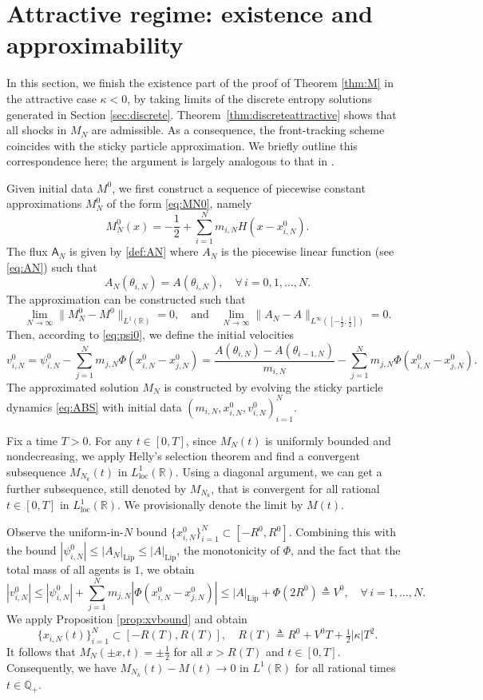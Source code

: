 \documentclass[11pt,reqno]{amsart}
\theoremstyle{definition}
\theoremstyle{remark}
\def\R{\mathbb{R}}
\def\loc{\mathrm{loc}}
\def\A{\mathsf{A}}
\DeclareMathOperator{\Lip}{Lip}
\begin{document}
	
	
	
	\section{Attractive regime: existence and approximability}
	\label{sec:gendata}
	
	In this section, we finish the existence part of the proof of Theorem \ref{thm:M} in the attractive case $\kappa<0$, by taking limits of the discrete entropy solutions generated in Section \ref{sec:discrete}.  Theorem~\ref{thm:discreteattractive} shows that all shocks in $M_N$ are admissible. As a consequence, the front-tracking scheme coincides with the sticky particle approximation. We briefly outline this correspondence here; the argument is largely analogous to that in \cite{leslie2023sticky}.
	
	Given initial data $M^0$, we first construct a sequence of piecewise constant approximations $M_N^0$ of the form \eqref{eq:MN0}, namely
	\[
	M_N^0(x) = -\frac12 + \sum_{i=1}^{N} m_{i,N} H(x - x_{i,N}^0).
	\]
	The flux $\A_N$ is given by \eqref{def:AN} where $A_N$ is the piecewise linear function (see \eqref{eq:AN}) such that
	\[
	A_N(\theta_{i,N}) = A(\theta_{i,N}),\quad \forall\,i=0,1,\ldots,N.
	\]
	The approximation can be constructed such that
	\[
	\lim_{N\to\infty}\|M_N^0-M^0\|_{L^1(\R)}=0,\quad\text{and}\quad
	\lim_{N\to\infty}\|A_N-A\|_{L^\infty([-\frac12,\frac12])}=0.
	\]
	Then, according to \eqref{eq:psi0}, we define the initial velocities 
	\[
	v_{i,N}^0 = \psi_{i,N}^0 - \sum_{j=1}^{N} m_{j,N} \Phi(x_{i,N}^0 - x_{j,N}^0)
	= \frac{A(\theta_{i,N})-A(\theta_{i-1,N})}{m_{i,N}} - \sum_{j=1}^{N} m_{j,N} \Phi(x_{i,N}^0 - x_{j,N}^0).
	\]
	The approximated solution $M_N$ is constructed by evolving the sticky particle dynamics \eqref{eq:ABS} with initial data $(m_{i,N},x_{i,N}^0,v_{i,N}^0)_{i=1}^N$.
	
	Fix a time $T>0$. For any $t\in[0,T]$, since $M_N(t)$ is uniformly bounded and nondecreasing, we apply Helly's selection theorem and find a convergent subsequence $M_{N_k}(t)$ in $L^1_{\loc}(\R)$. Using a diagonal argument, we can get a further subsequence, still denoted by $M_{N_k}$, that is convergent for all rational $t\in[0,T]$ in $L^1_{\loc}(\R)$.  We provisionally denote the limit by $M(t)$.
	
	Observe the uniform-in-$N$ bound $\{x_{i,N}^0\}_{i=1}^N\subset [-R^0, R^0]$.  Combining this with the bound $|\psi_{i,N}^0|\le |A_N|_{\Lip} \le |A|_{\Lip}$, the monotonicity of $\Phi$, and the fact that the total mass of all agents is $1$, we obtain 
	\[
	|v_{i,N}^0| \le |\psi_{i,N}^0| + \sum_{j=1}^N m_{j,N} |\Phi(x_{i,N}^0 - x_{j,N}^0)| \le |A|_{\Lip}  + \Phi(2R^0) \triangleq V^0,\quad \forall\, i=1,\ldots,N.
	\]
	We apply Proposition \ref{prop:xvbound} and obtain 
	\[
	\{x_{i,N}(t)\}_{i=1}^N\subset [-R(T),R(T)],\quad R(T) \triangleq R^0 + V^0T +\tfrac12|\kappa| T^2.
	\]
	It follows that $M_N(\pm x,t)=\pm\tfrac12$ for all $x>R(T)$ and $t\in[0,T]$. Consequently, we have $M_{N_k}(t)-M(t)\to 0$ in $L^1(\R)$ for all rational times $t\in \mathbb{Q}_+$.
	
\end{document}
